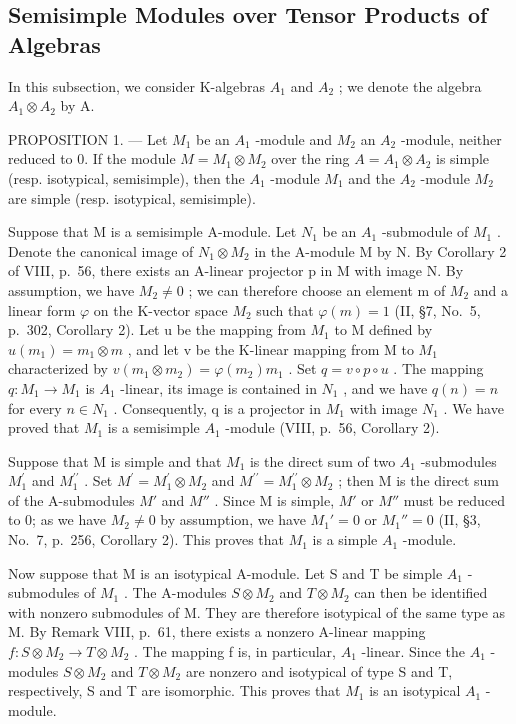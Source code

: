 \subsection{Semisimple Modules over Tensor Products of Algebras}

In this subsection, we consider K-algebras \(A_{1}\) and \(A_{2}\) ; we denote the algebra \(A_{1} \otimes A_{2}\) by A.

PROPOSITION 1. --- Let \(M_{1}\) be an \(A_{1}\) -module and \(M_{2}\) an \(A_{2}\) -module, neither reduced to 0. If the module \(M = M_{1} \otimes M_{2}\) over the ring \(A = A_{1} \otimes A_{2}\) is simple (resp. isotypical, semisimple), then the \(A_{1}\) -module \(M_{1}\) and the \(A_{2}\) -module \(M_{2}\) are simple (resp. isotypical, semisimple).

Suppose that M is a semisimple A-module. Let \(N_{1}\) be an \(A_{1}\) -submodule of \(M_{1}\) . Denote the canonical image of \(N_{1} \otimes M_{2}\) in the A-module M by N. By Corollary 2 of VIII, p.~56, there exists an A-linear projector p in M with image N. By assumption, we have \(M_{2} \neq 0\) ; we can therefore choose an element m of \(M_{2}\) and a linear form \(\varphi\) on the K-vector space \(M_{2}\) such that \(\varphi(m) = 1\) (II, §7, No.~5, p.~302, Corollary 2). Let u be the mapping from \(M_{1}\) to M defined by \(u(m_{1}) = m_{1} \otimes m\) , and let v be the K-linear mapping from M to \(M_{1}\) characterized by \(v(m_{1} \otimes m_{2}) = \varphi(m_{2})m_{1}\) . Set \(q = v \circ p \circ u\) . The mapping \(q : M_{1} \to M_{1}\) is \(A_{1}\) -linear, its image is contained in \(N_{1}\) , and we have \(q(n) = n\) for every \(n \in N_{1}\) . Consequently, q is a projector in \(M_{1}\) with image \(N_{1}\) . We have proved that \(M_{1}\) is a semisimple \(A_{1}\) -module (VIII, p.~56, Corollary 2).

Suppose that M is simple and that \(M_{1}\) is the direct sum of two \(A_{1}\) -submodules \(M_{1}^{\prime}\) and \(M_{1}^{\prime\prime}\) . Set \(M^{\prime}=M_{1}^{\prime}\otimes M_{2}\) and \(M^{\prime\prime}=M_{1}^{\prime\prime}\otimes M_{2}\) ; then M is the direct sum of the A-submodules \(M'\) and \(M''\) . Since M is simple, \(M'\) or \(M''\) must be reduced to 0; as we have \(M_{2} \neq 0\) by assumption, we have \(M_{1}' = 0\) or \(M_{1}'' = 0\) (II, §3, No.~7, p.~256, Corollary 2). This proves that \(M_{1}\) is a simple \(A_{1}\) -module.

Now suppose that M is an isotypical A-module. Let S and T be simple \(A_{1}\) -submodules of \(M_{1}\) . The A-modules \(S \otimes M_{2}\) and \(T \otimes M_{2}\) can then be identified with nonzero submodules of M. They are therefore isotypical of the same type as M. By Remark VIII, p.~61, there exists a nonzero A-linear mapping \(f : S \otimes M_{2} \to T \otimes M_{2}\) . The mapping f is, in particular, \(A_{1}\) -linear. Since the \(A_{1}\) -modules \(S \otimes M_{2}\) and \(T \otimes M_{2}\) are nonzero and isotypical of type S and T, respectively, S and T are isomorphic. This proves that \(M_{1}\) is an isotypical \(A_{1}\) -module.

